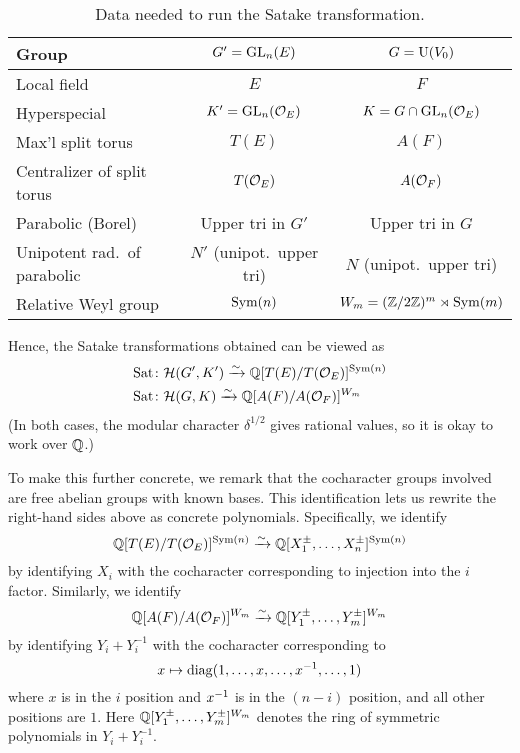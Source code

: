 \begin{table}[ht]
  \centering
  \begin{tabular}{p{6em}cc}
    \toprule
    Group & $G' = \operatorname{GL}_n(E)$ & $G = \operatorname{U}(V_0)$ \\ \midrule
    Local field & $E$ & $F$ \\\hline
    Hyperspecial & $K' = \operatorname{GL}_n(\mathcal O_E)$ & $K = G \cap \operatorname{GL}_n(\mathcal O_E)$ \\\hline
    Max'l split torus & $T(E)$ & $A(F)$ \\\hline
    Centralizer of split torus & $T(\mathcal O_E)$ & $A(\mathcal O_F)$ \\\hline
    Parabolic (Borel) & Upper tri in $G'$ & Upper tri in $G$ \\\hline
    Unipotent rad.\ of parabolic & $N'$ (unipot.\ upper tri) & $N$ (unipot.\ upper tri) \\\hline
    Relative Weyl group & $\operatorname{Sym}(n)$ & $W_m = (\mathbb Z/2\mathbb Z)^m \rtimes \operatorname{Sym}(m)$ \\
    \bottomrule
  \end{tabular}
  \caption{Data needed to run the Satake transformation.}
  \label{tab:satakestuff}
\end{table}

Hence, the Satake transformations obtained can be viewed as
\begin{align*}
  \operatorname{Sat} &\colon \mathcal H(G', K') \xrightarrow{\sim} \mathbb Q[T(E) / T(\mathcal O_E)]^{\operatorname{Sym}(n)} \\
  \operatorname{Sat} &\colon \mathcal H(G, K)\xrightarrow{\sim} \mathbb Q[A(F) / A(\mathcal O_F)]^{W_m}
\end{align*}
(In both cases, the modular character $\delta^{1/2}$ gives rational values,
so it is okay to work over $\mathbb Q$.)

To make this further concrete, we remark that the cocharacter groups
involved are free abelian groups with known bases.
This identification lets us rewrite the right-hand sides above as concrete polynomials.
Specifically, we identify
\[ \mathbb Q[T(E) / T(\mathcal O_E)]^{\operatorname{Sym}(n)}
  \xrightarrow{\sim} \mathbb Q[X_1^\pm, \dots, X_n^\pm]^{\operatorname{Sym}(n)} \]
by identifying $X_i$ with the
cocharacter corresponding to injection into the $i$ factor.
Similarly, we identify
\[ \mathbb Q[A(F) / A(\mathcal O_F)]^{W_m}
  \xrightarrow{\sim} \mathbb Q[Y_1^{\pm}, \dots, Y_m^{\pm}]^{W_m} \]
by identifying $Y_i + Y_i^{-1}$
with the cocharacter corresponding to
\[ x \mapsto \operatorname{diag}(1, \dots, x, \dots, x^{-1}, \dots, 1) \]
where $x$ is in the $i$ position and $x^{-1}$ is in the $(n-i)$ position,
and all other positions are $1$.
Here $\mathbb Q[Y_1^{\pm}, \dots, Y_m^{\pm}]^{W_m}$
denotes the ring of symmetric polynomials in $Y_i + Y_i^{-1}$.

